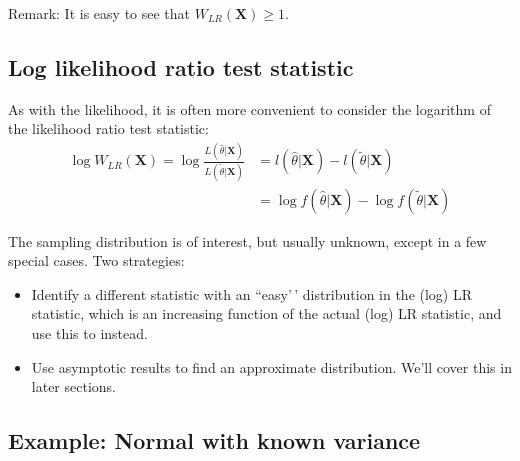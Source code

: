 \documentclass[
]{book}
\providecommand{\tightlist}{%
  \setlength{\itemsep}{0pt}\setlength{\parskip}{0pt}}
\newcommand{\bX}{{\boldsymbol X}}
\theoremstyle{definition}
\theoremstyle{definition}
\theoremstyle{definition}
\theoremstyle{definition}
\theoremstyle{remark}
\begin{document}
Remark: It is easy to see that \(W_{LR}(\bX) \geq 1\).

\hypertarget{log-likelihood-ratio-test-statistic}{%
\subsection{Log likelihood ratio test statistic}\label{log-likelihood-ratio-test-statistic}}

As with the likelihood, it is often more convenient to consider the logarithm of the likelihood ratio test statistic:
\begin{align*}
\log W_{LR}(\bX) 
= \log \frac{L(\hat\theta|\bX)}{L(\tilde\theta|\bX)} 
&= l(\hat\theta|\bX) - l(\tilde \theta|\bX)\\ 
&= \log  f(\hat\theta|\bX) - \log f(\tilde\theta|\bX)
\end{align*}

The sampling distribution is of interest, but usually unknown, except in a few special cases. Two strategies:

\begin{itemize}
\tightlist
\item
  Identify a different statistic with an ``easy'\,' distribution in the (log) LR statistic, which is an increasing function of the actual (log) LR statistic, and use this to instead.
\item
  Use asymptotic results to find an approximate distribution. We'll cover this in later sections.
\end{itemize}

\hypertarget{example-normal-with-known-variance}{%
\subsection{Example: Normal with known variance}\label{example-normal-with-known-variance}}
\end{document}
